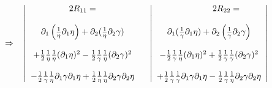  \begin{align}
  \Rightarrow\quad &\left| \begin{array}{c}
  2R_{11} = \\\\
 \partial_{1}\left(\frac{1}{\eta}\partial_{1} \eta\right)+ \partial_2( \frac{1}{\eta}\partial_2 \gamma)\\\\
  + \frac{1}{2}\frac{1}{\eta}\frac{1}{\eta}(\partial_1 \eta)^2 - \frac{1}{2}\frac{1}{\gamma}\frac{1}{\eta}(\partial_2 \gamma)^2\\\\ - \frac{1}{2} \frac{1}{\gamma}\frac{1}{\eta}\partial_1 \gamma \partial_{1} \eta  +\frac{1}{2}\frac{1}{\eta}\frac{1}{\eta}\partial_2 \gamma \partial_{2} \eta \\
\end{array}\right.\quad
\left|\begin{array}{c}
  \quad\quad\quad\quad 2R_{22} = \\\\
    \partial_1(\frac{1}{\gamma}\partial_1 \eta) +\partial_{2}\left(\frac{1}{\gamma}\partial_{2} \gamma\right)\\\\
    - \frac{1}{2}\frac{1}{\gamma}\frac{1}{\eta}(\partial_1 \eta )^2 + \frac{1}{2}\frac{1}{\gamma}\frac{1}{\gamma}(\partial_2 \gamma)^2\\\\
  + \frac{1}{2}\frac{1}{\gamma}\frac{1}{\gamma}\partial_{1} \gamma\partial_1 \eta  - \frac{1}{2} \frac{1}{\gamma}\frac{1}{\eta}\partial_{2} \gamma\partial_2 \eta  \\
 \end {array}\right|
 \end{align}\\\\ 
  
